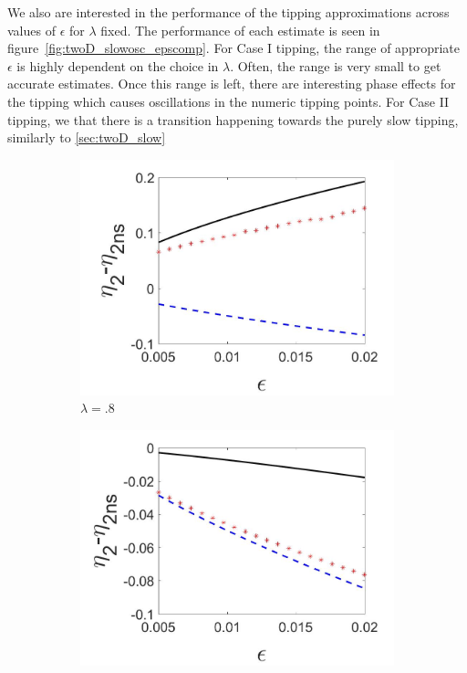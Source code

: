 We also are interested in the performance of the tipping approximations across values of $\epsilon$ for $\lambda$ fixed. The performance of each estimate is seen in figure~\ref{fig:twoD_slowosc_epscomp}. For Case I tipping, the range of appropriate $\epsilon$ is highly dependent on the choice in $\lambda$. Often, the range is very small to get accurate estimates. Once this range is left, there are interesting phase effects for the tipping which causes oscillations in the numeric tipping points. For Case II tipping, we that there is a transition happening towards the purely slow tipping, similarly to \autoref{sec:twoD_slow}


\begin{figure}[H]
\centering
\begin{subfigure}{.5\textwidth}
 \centering
 \includegraphics[width=\linewidth]{twoD/slowosc_epscomp_mixed.jpg}
 \caption{$\lambda=.8$}
\end{subfigure}%
\begin{subfigure}{.5\textwidth}
 \centering
 \includegraphics[width=\linewidth]{twoD/slowosc_epscomp_slow.jpg}

\end{subfigure}
\end{figure}
